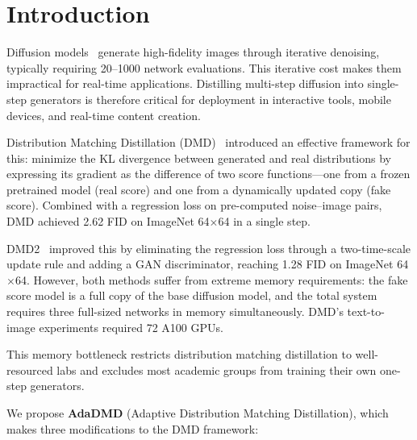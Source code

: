 \documentclass{article}
\theoremstyle{plain}
\theoremstyle{remark}
\begin{document}
\section{Introduction}
\label{sec:intro}

Diffusion models~\citep{ho2020denoising, song2021scorebased} generate high-fidelity images through iterative denoising, typically requiring 20--1000 network evaluations. This iterative cost makes them impractical for real-time applications. Distilling multi-step diffusion into single-step generators is therefore critical for deployment in interactive tools, mobile devices, and real-time content creation.

Distribution Matching Distillation (DMD)~\citep{yin2024onestep} introduced an effective framework for this: minimize the KL divergence between generated and real distributions by expressing its gradient as the difference of two score functions---one from a frozen pretrained model (real score) and one from a dynamically updated copy (fake score). Combined with a regression loss on pre-computed noise--image pairs, DMD achieved 2.62 FID on ImageNet 64$\times$64 in a single step.

DMD2~\citep{yin2024dmd2} improved this by eliminating the regression loss through a two-time-scale update rule and adding a GAN discriminator, reaching 1.28 FID on ImageNet 64$\times$64. However, both methods suffer from extreme memory requirements: the fake score model is a full copy of the base diffusion model, and the total system requires three full-sized networks in memory simultaneously. DMD's text-to-image experiments required 72 A100 GPUs.

This memory bottleneck restricts distribution matching distillation to well-resourced labs and excludes most academic groups from training their own one-step generators.

We propose \textbf{AdaDMD} (Adaptive Distribution Matching Distillation), which makes three modifications to the DMD framework:
\end{document}
